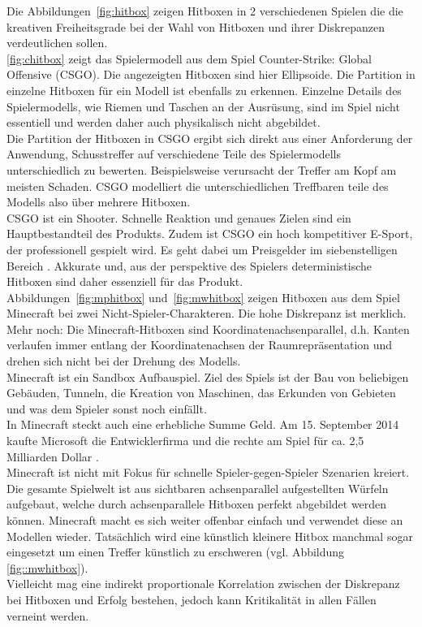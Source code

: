Die Abbildungen~\ref{fig:hitbox} zeigen Hitboxen in 2 verschiedenen Spielen die die kreativen Freiheitsgrade bei der Wahl von Hitboxen und ihrer Diskrepanzen verdeutlichen sollen.\\
\ref{fig:chitbox} zeigt das Spielermodell aus dem Spiel Counter-Strike: Global Offensive (CSGO). Die angezeigten Hitboxen sind hier Ellipsoide.
Die Partition in einzelne Hitboxen für ein Modell ist ebenfalls zu erkennen.
Einzelne Details des Spielermodells, wie Riemen und Taschen an der Ausrüsung, sind im Spiel nicht essentiell und werden daher auch physikalisch nicht abgebildet.\\
Die Partition der Hitboxen in CSGO ergibt sich direkt aus einer Anforderung der Anwendung, Schusstreffer auf verschiedene Teile des Spielermodells unterschiedlich zu bewerten. Beispielsweise verursacht der Treffer am Kopf am meisten Schaden. CSGO modelliert die unterschiedlichen Treffbaren teile des Modells also über mehrere Hitboxen.\\
CSGO ist ein Shooter. Schnelle Reaktion und genaues Zielen sind ein Hauptbestandteil des Produkts. Zudem ist CSGO ein hoch kompetitiver E-Sport, der professionell gespielt wird. Es geht dabei um Preisgelder im siebenstelligen Bereich \cite{csgoprice}. Akkurate und, aus der perspektive des Spielers deterministische Hitboxen sind daher essenziell für das Produkt.\\
Abbildungen~\ref{fig:mphitbox} und~\ref{fig:mwhitbox} zeigen Hitboxen aus dem Spiel Minecraft bei zwei Nicht-Spieler-Charakteren. Die hohe Diskrepanz ist merklich. Mehr noch: Die Minecraft-Hitboxen sind Koordinatenachsenparallel, d.h. Kanten verlaufen immer entlang der Koordinatenachsen der Raumrepräsentation und drehen sich nicht bei der Drehung des Modells.\\
Minecraft ist ein Sandbox Aufbauspiel. Ziel des Spiels ist der Bau von beliebigen Gebäuden, Tunneln, die Kreation von Maschinen, das Erkunden von Gebieten und was dem Spieler sonst noch einfällt.\\
In Minecraft steckt auch eine erhebliche Summe Geld. Am 15. September 2014 kaufte Microsoft die Entwicklerfirma und die rechte am Spiel für ca. 2,5 Milliarden Dollar \cite{buyminecraft}.\\
Minecraft ist nicht mit Fokus für schnelle Spieler-gegen-Spieler Szenarien kreiert. Die gesamte Spielwelt ist aus sichtbaren achsenparallel aufgestellten Würfeln aufgebaut, welche durch achsenparallele Hitboxen perfekt abgebildet werden können. Minecraft macht es sich weiter offenbar einfach und verwendet diese an Modellen wieder. Tatsächlich wird eine künstlich kleinere Hitbox manchmal sogar eingesetzt um einen Treffer künstlich zu erschweren (vgl. Abbildung \ref{fig::mwhitbox}).\\
Vielleicht mag eine indirekt proportionale Korrelation zwischen der Diskrepanz bei Hitboxen und Erfolg bestehen, jedoch kann Kritikalität in allen Fällen verneint werden.
